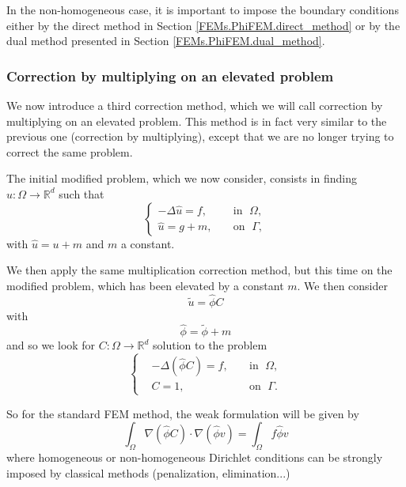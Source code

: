 In the non-homogeneous case, it is important to impose the boundary conditions either by the direct method in Section \ref{FEMs.PhiFEM.direct_method} or by the dual method presented in Section \ref{FEMs.PhiFEM.dual_method}.

\subsubsection{Correction by multiplying on an elevated problem} \label{Corr.method.mult_reh}

We now introduce a third correction method, which we will call correction by multiplying on an elevated problem. This method is in fact very similar to the previous one (correction by multiplying), except that we are no longer trying to correct the same problem.

The initial modified problem, which we now consider, consists in finding $u : \Omega \rightarrow \mathbb{R}^d$ such that
\begin{equation*}
	\left\{
	\begin{aligned}
		-\Delta \hat{u} = f, \; &&\text{in } \; \Omega, \\
		\hat{u}=g+m, \; &&\text{on } \; \Gamma,
	\end{aligned}
	\right. %
\end{equation*}
with $\hat{u}=u+m$ and $m$ a constant.

We then apply the same multiplication correction method, but this time on the modified problem, which has been elevated by a constant $m$. We then consider
\begin{equation*}
	\tilde{u}=\hat{\phi}C
\end{equation*}
with 
\begin{equation*}
	\hat{\phi}=\tilde{\phi}+m
\end{equation*}
and so we look for $C: \Omega \rightarrow \mathbb{R}^d$ solution to the problem
\begin{equation*}
	\label{eq.corr.pbc_mult_reh}
	\left\{\begin{aligned}
		&-\Delta (\hat{\phi}C)=f, \; &&\text{in } \; \Omega, \\
		&C=1, \; &&\text{on } \; \Gamma.
	\end{aligned}\right. %
\end{equation*}

So for the standard FEM method, the weak formulation will be given by
\begin{equation*}
	\int_\Omega \nabla (\hat{\phi}C)\cdot\nabla (\hat{\phi}v)=\int_\Omega f\hat{\phi}v
\end{equation*}
where homogeneous or non-homogeneous Dirichlet conditions can be strongly imposed by classical methods (penalization, elimination...)

